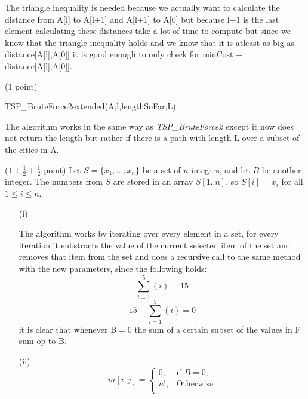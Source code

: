 \documentclass{article}
\renewcommand{\leq}{\leqslant}
\newcounter{rcounter}
\newenvironment{rlist}%
{\begin{list}{A.1-\arabic{rcounter}}{\usecounter{rcounter}}}{\end{list}}
\begin{document}
\begin{rlist}
The triangle inequality is needed because we actually want to calculate the distance from A[l] to A[l+1] and A[l+1] to A[0] but because l+1 is the last element calculating these distances take a lot of time to compute but since we know that the triangle inequality holds and we know that it is atleast as big as distance[A[l],A[0]] it is good enough to only check for minCost $+$ distance[A[l],A[0]].

\item (1 point) 
\begin{algorithmic}[1]
\STATE TSP\_BruteForce2extended(A,l,lengthSoFar,L)
\ELSE
{}
\ENDIF
{}
\ENDFOR
\ENDIF
{}
\end{algorithmic}

The algorithm works in the same way as \textit{TSP\_BruteForce2} except it now does not return the length but rather if there is a path with length L over a subset of the cities in A.

\item ($1+\frac{1}{2}+\frac{1}{2}$ point)
      Let $S=\{x_1,\ldots,x_{n}\}$ be a set of $n$ integers, and let $B$ be another integer.
      The numbers from $S$ are stored in an array $S[1..n]$, so $S[i]=x_i$ for all $1\leq i \leq n$.
      \begin{enumerate}
      \item[(i)]
\begin{algorithmic}[1]
\ELSE
{}
\ENDIF
\ENDFOR
{}
\ENDIF
\end{algorithmic}

The algorithm works by iterating over every element in a set, for every iteration it substracts the value of the current selected item of the set and removes that item from the set and does a recursive call to the same method with the new parameters, since the following holds: \[
\sum_{i=1}^5(i)=15 \]
\[15-\sum_{i=1}^5(i)=0\]
it is clear that whenever B$=0$ the sum of a certain subset of the values in F sum op to B.
      \item[(ii)] \[
m[i,j]=
\begin{cases}
0, &\text{if $B=0$;}\\
n!, & \text{Otherwise} \\


\end{cases}\]
\end{enumerate}
\end{rlist}
\end{document}
